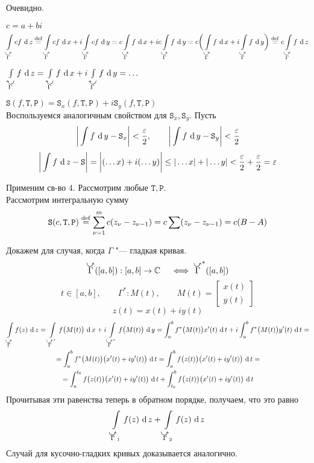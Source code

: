 \begin{eproof}
	\item Очевидно.

	\item $ c = a + bi $
	$$ \cint[z]{\curvedir\Gamma}{cf} \bydef \cint[x]{\curvedir\Gamma}{cf} + i \cint[y]{\curvedir\Gamma}{cf} = c \cint[x]{\curvedir\Gamma}f + ic \cint[y]{\curvedir\Gamma}f = c \bigg( \cint[x]{\curvedir\Gamma}f + i \cint[y]{\curvedir\Gamma}f \bigg) \bydef c \cint[z]{\curvedir\Gamma}f $$

	\item $ \cint[z]{\curvedir[0]\Gamma}f = \cint[x]{\curvedir[0]\Gamma}f + i \cint[y]{\curvedir[0]\Gamma}f = \dots $

	\item $ \mathtt S(f, \mathtt T, \mathtt P) = \mathtt S_x(f, \mathtt T, \mathtt P) + i \mathtt S_y(f, \mathtt T, \mathtt P) $ \\
	Воспользуемся аналогичным свойством для $ \mathtt S_x, \mathtt S_y $. Пусть
	$$ \bigg| \sint[y]f - \mathtt S_x \bigg| < \frac\eps2, \qquad \bigg| \sint[y]f - \mathtt S_y \bigg| < \frac\eps2 $$
	$$ \bigg| \sint[z]f - \mathtt S \bigg| = \bigg| (\dots x) + i(\dots y) \bigg| \le |\dots x| + |\dots y| < \frac\eps2 + \frac\eps2 = \eps $$

	\item Применим св-во 4. Рассмотрим любые $ \mathtt T, \mathtt P $. \\
	Рассмотрим интегральную сумму
	$$ \mathtt S(c, \mathtt T, \mathtt P) \bydef \sum_{\nu = 1}^m c(z_\nu - z_{\nu - 1}) = c \sum (z_\nu - z_{\nu - 1}) = c(B - A) $$

	\item Докажем для случая, когда $ \Gamma $ "--- гладкая кривая.
	$$ \curvedir\Gamma([a, b]) : [a, b] \to \Co \quad \iff \curvedir\Gamma^*([a, b]) $$
	$$ t \in [a, b], \qquad \Gamma^* : M(t), \qquad M(t) =
	\begin{bmatrix}
		x(t) \\
		y(t)
	\end{bmatrix} $$
	$$ z(t) = x(t) + iy(t) $$
	\begin{multline*}
		\cint[z]{\curvedir \Gamma}{f(z)} = \cint[x]{\curvedir\Gamma^*}{f \big( M(t) \big)} + i \cint[y]{\curvedir\Gamma^*}{f \big( M(t) \big)} = \dint[t]ab{ f^* \big( M(t) \big)x'(t)} + i \dint[t]ab{f^* \big( M(t) \big) y'(t)} = \\
		= \dint[t]ab{ f^* \big( M(t) \big) \big( x'(t) + iy'(t) \big)} = \dint[t]ab{f \big( z(t) \big) \big( x'(t) + iy'(t) \big)} = \\
		= \dint[t]a{t_0}{ f \big( z(t) \big) \big( x'(t) + iy'(t) \big)} + \dint[t]{t_0}b{ f \big( z(t) \big) \big( x'(t) + iy'(t) \big)}
	\end{multline*}
	Прочитывая эти равенства теперь в обратном порядке, получаем, что это равно
	$$ \cint[z]{\curvedir\Gamma_1}{f(z)} + \cint[z]{\curvedir\Gamma_2}{f(z)} $$
	Случай для кусочно-гладких кривых доказывается аналогично.


\end{eproof}
